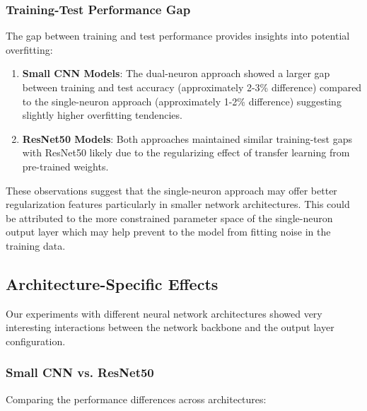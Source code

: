\subsubsection{Training-Test Performance Gap}

The gap between training and test performance provides insights into potential overfitting:

\begin{enumerate}
\item \textbf{Small CNN Models}: The dual-neuron approach showed a larger gap between training and test accuracy (approximately 2-3\% difference) compared to the single-neuron approach (approximately 1-2\% difference) suggesting slightly higher overfitting tendencies.

\item \textbf{ResNet50 Models}: Both approaches maintained similar training-test gaps with ResNet50 likely due to the regularizing effect of transfer learning from pre-trained weights.
\end{enumerate}

These observations suggest that the single-neuron approach may offer better regularization features particularly in smaller network architectures. This could be attributed to the more constrained parameter space of the single-neuron output layer which may help prevent to the model from fitting noise in the training data.

\subsection{Architecture-Specific Effects}

Our experiments with different neural network architectures showed very interesting interactions between the network backbone and the output layer configuration.

\subsubsection{Small CNN vs. ResNet50}

Comparing the performance differences across architectures:

